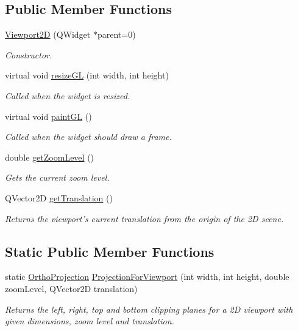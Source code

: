 \subsection*{Public Member Functions}
\begin{DoxyCompactItemize}
\item 
\hyperlink{class_viewport2_d_aa5e3b899a35b53daea5365c4c1000097}{Viewport2\-D} (Q\-Widget $\ast$parent=0)
\begin{DoxyCompactList}\small\item\em Constructor. \end{DoxyCompactList}\item 
virtual void \hyperlink{class_viewport2_d_ada44de84e4126a538047f6c99ae9c119}{resize\-G\-L} (int width, int height)
\begin{DoxyCompactList}\small\item\em Called when the widget is resized. \end{DoxyCompactList}\item 
\hypertarget{class_viewport2_d_a1ecc4c353f1eb8e10713f2890bf95e18}{virtual void \hyperlink{class_viewport2_d_a1ecc4c353f1eb8e10713f2890bf95e18}{paint\-G\-L} ()}\label{class_viewport2_d_a1ecc4c353f1eb8e10713f2890bf95e18}

\begin{DoxyCompactList}\small\item\em Called when the widget should draw a frame. \end{DoxyCompactList}\item 
double \hyperlink{class_viewport2_d_a36972318192673b50da2552b68215cb3}{get\-Zoom\-Level} ()
\begin{DoxyCompactList}\small\item\em Gets the current zoom level. \end{DoxyCompactList}\item 
Q\-Vector2\-D \hyperlink{class_viewport2_d_adee217b48e7114c7022b938bbdd64e1c}{get\-Translation} ()
\begin{DoxyCompactList}\small\item\em Returns the viewport's current translation from the origin of the 2\-D scene. \end{DoxyCompactList}\end{DoxyCompactItemize}
\subsection*{Static Public Member Functions}
\begin{DoxyCompactItemize}
\item 
static \hyperlink{struct_ortho_projection}{Ortho\-Projection} \hyperlink{class_viewport2_d_a1c3d0b1d2688df9b835fd9a72c8aef39}{Projection\-For\-Viewport} (int width, int height, double zoom\-Level, Q\-Vector2\-D translation)
\begin{DoxyCompactList}\small\item\em Returns the left, right, top and bottom clipping planes for a 2\-D viewport with given dimensions, zoom level and translation. \end{DoxyCompactList}\end{DoxyCompactItemize}
